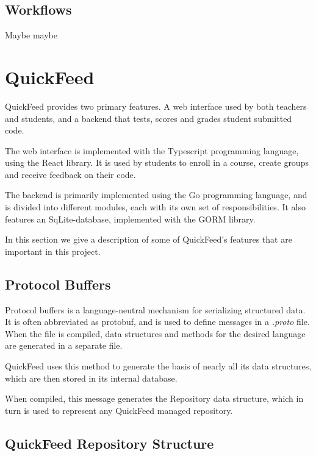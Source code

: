 \subsection{Workflows}

Maybe maybe

\section{QuickFeed}

QuickFeed provides two primary features.
A web interface used by both teachers and students, and a backend that tests, scores and grades student submitted code.

The web interface is implemented with the Typescript programming language, using the React library.
It is used by students to enroll in a course, create groups and receive feedback on their code.

The backend is primarily implemented using the Go programming language, and is divided into different modules, each with its own set of responsibilities.
It also features an SqLite-database, implemented with the GORM library.

In this section we give a description of some of QuickFeed's features that are important in this project.

\subsection{Protocol Buffers}

Protocol buffers is a language-neutral mechanism for serializing structured data. %
It is often abbreviated as protobuf, and is used to define messages in a \textit{.proto} file.
When the file is compiled, data structures and methods for the desired language are generated in a separate file.

QuickFeed uses this method to generate the basis of nearly all its data structures, which are then stored in its internal database.



When compiled, this message generates the Repository data structure, which in turn is used to represent any QuickFeed managed repository.

\subsection{QuickFeed Repository Structure}

